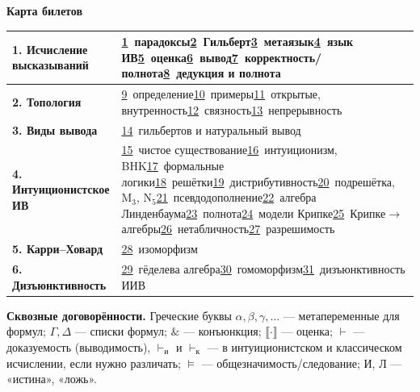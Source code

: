 \documentclass[11pt,a4paper]{article}
\newcommand{\amp}{\mathbin{\&}}
\newcommand{\vd}{\vdash}
\newcommand{\sem}[1]{\llbracket #1\rrbracket}
\newcommand{\True}{\text{И}}
\newcommand{\False}{\text{Л}}
\theoremstyle{definition}
\begin{document}
\clearpage
{}\label{map}
{\Large\bfseries Карта билетов}\par\medskip
\begin{center}
\renewcommand{\arraystretch}{1.5}
\begin{tabular}{|p{3.9cm}|p{11.6cm}|}
\hline
\textbf{1. Исчисление высказываний} & \hyperref[T:1]{1}\ парадоксы\quad \hyperref[T:2]{2}\ Гильберт\quad \hyperref[T:3]{3}\ метаязык\quad \hyperref[T:4]{4}\ язык ИВ\quad \hyperref[T:5]{5}\ оценка\quad \hyperref[T:6]{6}\ вывод\quad \hyperref[T:7]{7}\ корректность/полнота\quad \hyperref[T:8]{8}\ дедукция и полнота\\\hline
\textbf{2. Топология} & \hyperref[T:9]{9}\ определение\quad \hyperref[T:10]{10}\ примеры\quad \hyperref[T:11]{11}\ открытые, внутренность\quad \hyperref[T:12]{12}\ связность\quad \hyperref[T:13]{13}\ непрерывность\\\hline
\textbf{3. Виды вывода} & \hyperref[T:14]{14}\ гильбертов и натуральный вывод\\\hline
\textbf{4. Интуиционистское ИВ} & \hyperref[T:15]{15}\ чистое существование\quad \hyperref[T:16]{16}\ интуиционизм, BHK\quad \hyperref[T:17]{17}\ формальные логики\quad \hyperref[T:18]{18}\ решётки\quad \hyperref[T:19]{19}\ дистрибутивность\quad \hyperref[T:20]{20}\ подрешётка, M$_3$, N$_5$\quad \hyperref[T:21]{21}\ псевдодополнение\quad \hyperref[T:22]{22}\ алгебра Линденбаума\quad \hyperref[T:23]{23}\ полнота\quad \hyperref[T:24]{24}\ модели Крипке\quad \hyperref[T:25]{25}\ Крипке$\to$алгебры\quad \hyperref[T:26]{26}\ нетабличность\quad \hyperref[T:27]{27}\ разрешимость\\\hline
\textbf{5. Карри--Ховард} & \hyperref[T:28]{28}\ изоморфизм\\\hline
\textbf{6. Дизъюнктивность} & \hyperref[T:29]{29}\ гёделева алгебра\quad \hyperref[T:30]{30}\ гомоморфизм\quad \hyperref[T:31]{31}\ дизъюнктивность ИИВ\\\hline
\end{tabular}
\end{center}

\bigskip
\textbf{Сквозные договорённости.} Греческие буквы $\alpha,\beta,\gamma,\dots$ --- метапеременные
для формул; $\Gamma,\Delta$ --- списки формул; $\amp$ --- конъюнкция; $\sem{\cdot}$ --- оценка;
$\vd$ --- доказуемость (выводимость), $\vd_{\text{и}}$ и $\vd_{\text{к}}$ --- в интуиционистском
и классическом исчислении, если нужно различать; $\models$ --- общезначимость/следование;
$\True$, $\False$ --- «истина», «ложь».
\end{document}
